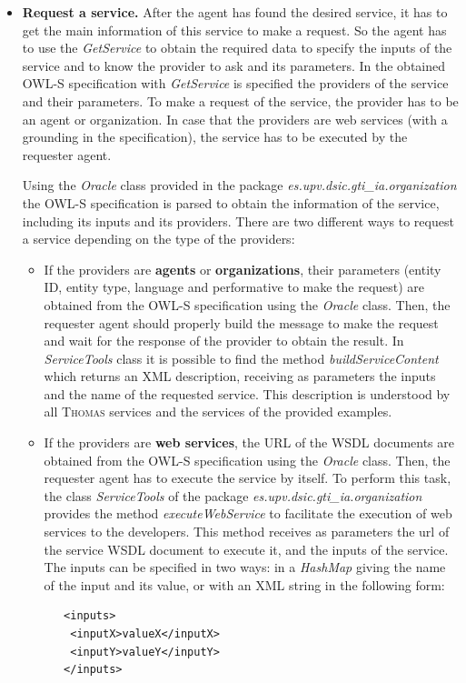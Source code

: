 \begin{itemize}
\item \textbf{Request a service.} After the agent has found the desired service, it has to get the main information of this service to make a request. So the agent has to use the \textit{GetService} to obtain the required data to specify the inputs of the service and to know the provider to ask and its parameters. In the obtained OWL-S specification with \textit{GetService} is specified the providers of the service and their parameters. To make a request of the service, the provider has to be an agent or organization. In case that the providers are web services (with a grounding in the specification), the service has to be executed by the requester agent. 

Using the \textit{Oracle} class provided in the package \textit{es.upv.dsic.gti\_ia.organization} the OWL-S specification is parsed to obtain the information of the service, including its inputs and its providers. There are two different ways to request a service depending on the type of the providers:
\begin{itemize}
 \item If the providers are \textbf{agents} or \textbf{organizations}, their parameters (entity ID, entity type, language and performative to make the request) are obtained from the OWL-S specification using the \textit{Oracle} class. Then, the requester agent should properly build the message to make the request and wait for the response of the provider to obtain the result. In \textit{ServiceTools} class it is possible to find the method \textit{buildServiceContent} which returns an XML description, receiving as parameters the inputs and the name of the requested service. This description is understood by all \textsc{Thomas} services and the services of the provided examples.
 
 \item If the providers are \textbf{web services}, the URL of the WSDL documents are obtained from the OWL-S specification using the \textit{Oracle} class. Then, the requester agent has to execute the service by itself. To perform this task, the class \textit{ServiceTools} of the package \textit{es.upv.dsic.gti\_ia.organization} provides the method \textit{executeWebService} to facilitate the execution of web services to the developers. This method receives as parameters  the url of the service WSDL document to execute it, and the inputs of the service. The inputs can be specified in two ways: in a \textit{HashMap} giving the name of the input and its value, or with an XML string in the following form:
  \begin{lstlisting}
   <inputs>
    <inputX>valueX</inputX>
    <inputY>valueY</inputY>
   </inputs>
  \end{lstlisting}
\end{itemize}

\end{itemize}

